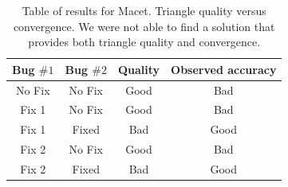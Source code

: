 \begin{table}[t]
\centering
\begin{tabular}{cccc}
Bug $\#1$ & Bug $\#2$ & Quality & Observed accuracy \\

\hline
No Fix & No Fix & Good & Bad  \\
\hline
Fix 1 & No Fix & Good & Bad\\
Fix 1 & Fixed & Bad & Good\\
\hline
Fix 2 & No Fix & Good & Bad\\
Fix 2 & Fixed & Bad & Good\\
\hline
\end{tabular}
\caption{Table of results for Macet. Triangle quality versus 
convergence. We were not able to find a solution that provides 
both triangle quality and convergence.}
\label{tab:results-macet}
\end{table}
